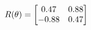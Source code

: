 \documentclass[preview]{standalone}
\begin{document}
\begin{align*}
\special{dvisvgm:raw <g id='unique000'>}R(\theta) = \begin{bmatrix}0.47 & 0.88\\-0.88 & 0.47\end{bmatrix}\special{dvisvgm:raw </g>}
\end{align*}
\end{document}
